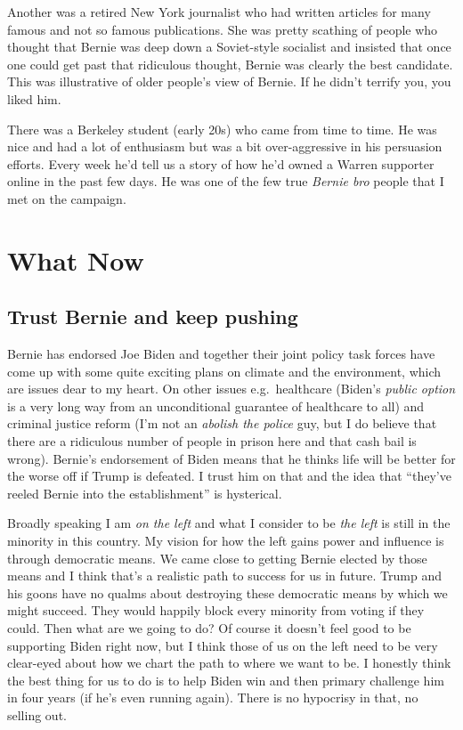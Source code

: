 \documentclass[]{book}
\begin{document}
Another was a retired New York journalist who had written articles for many famous and not so famous publications. She was pretty scathing of people who thought that Bernie was deep down a Soviet-style socialist and insisted that once one could get past that ridiculous thought, Bernie was clearly the best candidate. This was illustrative of older people's view of Bernie. If he didn't terrify you, you liked him.

There was a Berkeley student (early 20s) who came from time to time. He was nice and had a lot of enthusiasm but was a bit over-aggressive in his persuasion efforts. Every week he'd tell us a story of how he'd owned a Warren supporter online in the past few days. He was one of the few true \emph{Bernie bro} people that I met on the campaign.

\hypertarget{what-now}{%
\chapter{What Now}\label{what-now}}

\hypertarget{trust-bernie-and-keep-pushing}{%
\section{Trust Bernie and keep pushing}\label{trust-bernie-and-keep-pushing}}

Bernie has endorsed Joe Biden and together their joint policy task forces have come up with some quite exciting plans on climate and the environment, which are issues dear to my heart. On other issues e.g.~healthcare (Biden's \emph{public option} is a very long way from an unconditional guarantee of healthcare to all) and criminal justice reform (I'm not an \emph{abolish the police} guy, but I do believe that there are a ridiculous number of people in prison here and that cash bail is wrong). Bernie's endorsement of Biden means that he thinks life will be better for the worse off if Trump is defeated. I trust him on that and the idea that ``they've reeled Bernie into the establishment'' is hysterical.

Broadly speaking I am \emph{on the left} and what I consider to be \emph{the left} is still in the minority in this country. My vision for how the left gains power and influence is through democratic means. We came close to getting Bernie elected by those means and I think that's a realistic path to success for us in future. Trump and his goons have no qualms about destroying these democratic means by which we might succeed. They would happily block every minority from voting if they could. Then what are we going to do? Of course it doesn't feel good to be supporting Biden right now, but I think those of us on the left need to be very clear-eyed about how we chart the path to where we want to be. I honestly think the best thing for us to do is to help Biden win and then primary challenge him in four years (if he's even running again). There is no hypocrisy in that, no selling out.
\end{document}
